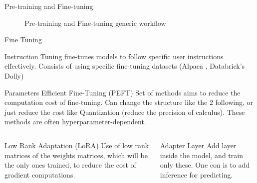 
\begin{frame}{Pre-training and Fine-tuning}
    \begin{figure}
        \centering
        
        \caption{Pre-training and Fine-tuning generic workflow}
    \end{figure}  
        

    
\end{frame}


\begin{frame}{Fine Tuning}

   \begin{block}{Instruction Tuning}
       fine-tunes models to follow specific user instructions effectively. Consists of using specific fine-tuning datasets (Alpaca \cite{alpaca}, Databrick's Dolly\cite{DatabricksBlog2023DollyV2})   
    \end{block}



    \begin{block}{Parameters Efficient Fine-Tuning (PEFT)}
    Set of methods aims to reduce the computation cost of fine-tuning. Can change the structure like the 2 following, or just reduce the cost like Quantization (reduce the precision of calculus). These methods are often hyperparameter-dependent.     
    \end{block}
    
    \begin{columns}  
  
        \begin{column}[t]{0.45\textwidth}
        \begin{block}{Low Rank Adaptation (LoRA)\cite{hu2021loralowrankadaptationlarge}}
                   Use of low rank matrices of the weights matrices, which will be the only ones trained, to reduce the cost of gradient computations.  
        \end{block}
        \end{column}
    
        \begin{column}[t]{0.45\textwidth}
        \begin{block}{Adapter Layer}
            Add layer inside the model, and train only these. One con is to add inference for predicting.
            
        \end{block}
        \end{column}
      
    \end{columns}

\end{frame}


